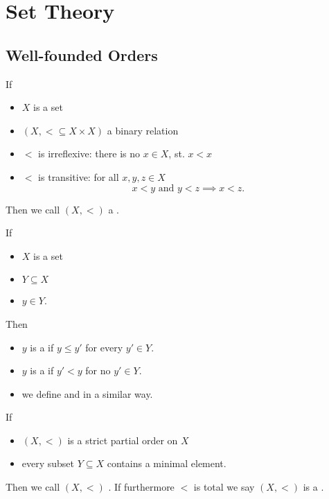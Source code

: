 \chapter{Set Theory}
\section{Well-founded Orders}

\begin{definition}
    If 
    \begin{itemize}
        \item $X$ is a set
        \item $(X, < \subseteq X \times X)$ a binary relation
        \item $<$ is irreflexive: there is no $x \in X$, st. $x < x$
        \item $<$ is transitive: for all $x,y,z \in X$
        $$ x < y \text{ and } y < z \implies x < z.$$
    \end{itemize}
    Then we call $(X, <)$ a .
\end{definition}

\begin{definition}
    If 
    \begin{itemize}
        \item $X$ is a set
        \item $Y \subseteq X$
        \item $y \in Y$.
    \end{itemize}
    Then 
    \begin{itemize}
        \item $y$ is a  if $y \leq y'$ for every $y' \in Y$.
        \item $y$ is a  if $y' < y$ for no $y' \in Y$.
        \item we define  and  in a similar way.
    \end{itemize}
\end{definition}

\begin{definition}
    If 
    \begin{itemize}
        \item $(X, <)$ is a strict partial order on $X$
        \item every subset $Y \subseteq X$ contains a minimal element.
    \end{itemize}
    Then we call $(X, <)$ . If furthermore $<$ is total we say $(X , <)$ is a .
\end{definition}

